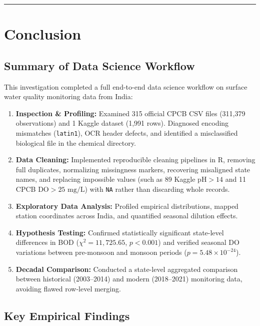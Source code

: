 \documentclass[
]{article}
\providecommand{\tightlist}{%
  \setlength{\itemsep}{0pt}\setlength{\parskip}{0pt}}
\begin{document}
\begin{center}\rule{0.5\linewidth}{0.5pt}\end{center}

\section{Conclusion}\label{conclusion}

\subsection{Summary of Data Science
Workflow}\label{summary-of-data-science-workflow}

This investigation completed a full end-to-end data science workflow on
surface water quality monitoring data from India:

\begin{enumerate}
\def\labelenumi{\arabic{enumi}.}
\tightlist
\item
  \textbf{Inspection \& Profiling:} Examined 315 official CPCB CSV files
  (311,379 observations) and 1 Kaggle dataset (1,991 rows). Diagnosed
  encoding mismatches (\texttt{latin1}), OCR header defects, and
  identified a misclassified biological file in the chemical directory.
\item
  \textbf{Data Cleaning:} Implemented reproducible cleaning pipelines in
  R, removing full duplicates, normalizing missingness markers,
  recovering misaligned state names, and replacing impossible values
  (such as 89 Kaggle \(\text{pH} > 14\) and 11 CPCB
  \(\text{DO} > 25\text{ mg/L}\)) with \texttt{NA} rather than
  discarding whole records.
\item
  \textbf{Exploratory Data Analysis:} Profiled empirical distributions,
  mapped station coordinates across India, and quantified seasonal
  dilution effects.
\item
  \textbf{Hypothesis Testing:} Confirmed statistically significant
  state-level differences in BOD (\(\chi^2 = 11,725.65\), \(p < 0.001\))
  and verified seasonal DO variations between pre-monsoon and monsoon
  periods (\(p = 5.48 \times 10^{-24}\)).
\item
  \textbf{Decadal Comparison:} Conducted a state-level aggregated
  comparison between historical (2003--2014) and modern (2018--2021)
  monitoring data, avoiding flawed row-level merging.
\end{enumerate}

\subsection{Key Empirical Findings}\label{key-empirical-findings}
\end{document}
